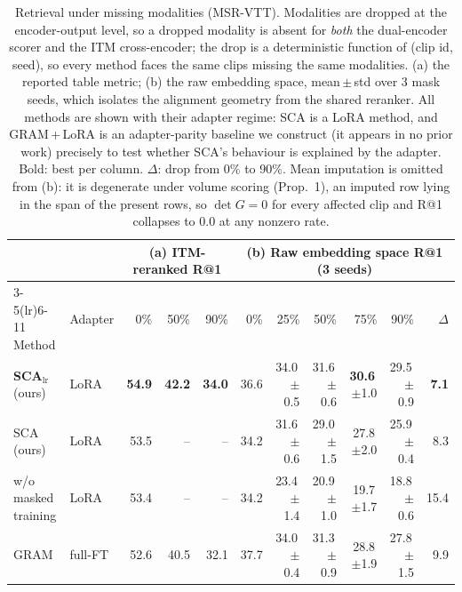 \begin{table}[t]
\centering
\caption{Retrieval under missing modalities (MSR-VTT). Modalities are dropped at the
encoder-output level, so a dropped modality is absent for \emph{both} the dual-encoder
scorer and the ITM cross-encoder; the drop is a deterministic function of (clip id,
seed), so every method faces the same clips missing the same modalities. (a) the
reported table metric; (b) the raw embedding space, mean\,$\pm$\,std over 3 mask seeds,
which isolates the alignment geometry from the shared reranker. All methods are shown
with their adapter regime: SCA is a LoRA method, and GRAM\,+\,LoRA is an adapter-parity
baseline we construct (it appears in no prior work) precisely to test whether SCA's
behaviour is explained by the adapter. Bold: best per column. $\Delta$: drop from 0\% to
90\%. Mean imputation is omitted from (b): it is degenerate under volume scoring
(Prop.~1), an imputed row lying in the span of the present rows, so $\det G=0$ for every
affected clip and R@1 collapses to 0.0 at any nonzero rate.}
\label{tab:missing}
\small
\setlength{\tabcolsep}{4.5pt}
\begin{tabular}{llrrr@{\hskip 14pt}rrrrrr}
\toprule
 & & \multicolumn{3}{c}{(a) ITM-reranked R@1} & \multicolumn{6}{c}{(b) Raw embedding space R@1 (3 seeds)} \\
\cmidrule(lr){3-5}\cmidrule(lr){6-11}
Method & Adapter & 0\% & 50\% & 90\% & 0\% & 25\% & 50\% & 75\% & 90\% & $\Delta$ \\
\midrule
\textbf{SCA}$_{\text{lr}}$ (ours) & LoRA & \textbf{54.9} & \textbf{42.2} & \textbf{34.0} & 36.6 & 34.0\,\tiny{$\pm$0.5} & 31.6\,\tiny{$\pm$0.6} & \textbf{30.6}\,\tiny{$\pm$1.0} & 29.5\,\tiny{$\pm$0.9} & \textbf{7.1} \\
SCA (ours) & LoRA & 53.5 & -- & -- & 34.2 & 31.6\,\tiny{$\pm$0.6} & 29.0\,\tiny{$\pm$1.5} & 27.8\,\tiny{$\pm$2.0} & 25.9\,\tiny{$\pm$0.4} & 8.3 \\
\quad w/o masked training & LoRA & 53.4 & -- & -- & 34.2 & 23.4\,\tiny{$\pm$1.4} & 20.9\,\tiny{$\pm$1.0} & 19.7\,\tiny{$\pm$1.7} & 18.8\,\tiny{$\pm$0.6} & 15.4 \\
\midrule
GRAM & full-FT & 52.6 & 40.5 & 32.1 & 37.7 & 34.0\,\tiny{$\pm$0.4} & 31.3\,\tiny{$\pm$0.9} & 28.8\,\tiny{$\pm$1.9} & 27.8\,\tiny{$\pm$1.5} & 9.9 \\

\end{tabular}
\end{table}
